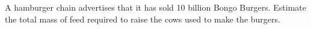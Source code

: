  A hamburger chain advertises that it has sold 10 billion
Bongo Burgers. Estimate the total mass of feed required to
raise the cows used to make the burgers.
